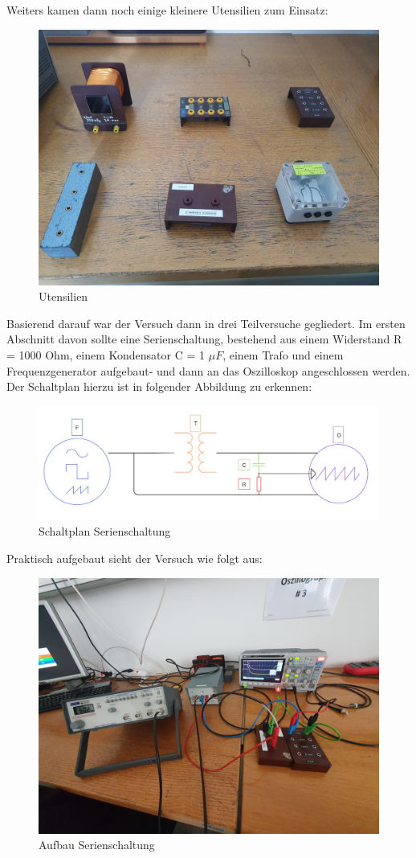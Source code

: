 \documentclass[12pt,a4paper,twoside]{article}
\begin{document}
\noindent
Weiters kamen dann noch einige kleinere Utensilien zum Einsatz:

\begin{figure}[H]
    \centering
    \includegraphics[width=0.6\linewidth, angle=0]{nudes/Utensilien.jpg}
    \caption{Utensilien}
    \label{fig:Utensilien}
\end{figure} 

\noindent
Basierend darauf war der Versuch dann in drei Teilversuche gegliedert. Im ersten Abschnitt davon sollte eine Serienschaltung, bestehend aus einem Widerstand R = 1000 Ohm, einem Kondensator C = 1 $\mu F$, einem Trafo und einem Frequenzgenerator aufgebaut- und dann an das Oszilloskop angeschlossen werden.
Der Schaltplan hierzu ist in folgender Abbildung zu erkennen:

\begin{figure}[H]
    \centering
    \includegraphics[width=0.6\linewidth, angle=0]{nudes/Serienschaltung gezeichnet.jpg}
    \caption{Schaltplan Serienschaltung}
    \label{fig:Schaltplan Serienschaltung}
\end{figure}

\noindent
Praktisch aufgebaut sieht der Versuch wie folgt aus:

\begin{figure}[H]
    \centering
    \includegraphics[width=0.6\linewidth, angle=0]{nudes/Aufbau Serienschaltung.jpg}
    \caption{Aufbau Serienschaltung}
    \label{fig:Aufbau Serienschaltung}
\end{figure} 
\end{document}
